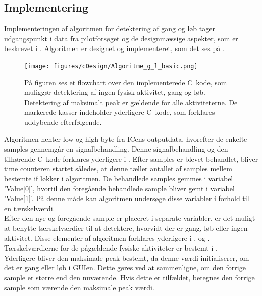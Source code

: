 \subsection{Implementering}
Implementeringen af algoritmen for detektering af gang og løb tager udgangspunkt i data fra pilotforsøget og de designmæssige aspekter, som er beskrevet i . Algoritmen er designet og implementeret, som det ses på .
\begin{figure}[H]
	\centering
	\texttt{[image: figures/cDesign/Algoritme\_g\_l\_basic.png]}
	\caption{På figuren ses et flowchart over den implementerede C~kode, som muliggør detektering af ingen fysisk aktivitet, gang og løb. Detektering af maksimalt peak er gældende for alle aktiviteterne. De markerede kasser indeholder yderligere C~kode, som forklares uddybende efterfølgende.}
	\label{fig:basic_algo_g_l}
\end{figure}\vspace{-0.25cm}
Algoritmen henter low og high byte fra ICens outputdata, hvorefter de enkelte samples gennemgår en signalbehandling. Denne signalbehandling og den tilhørende C~kode forklares yderligere i . Efter samples er blevet behandlet, bliver time counteren startet således, at denne tæller antallet af samples mellem bestemte if løkker i algoritmen. De behandlede samples gemmes i variabel 'Value[0]', hvortil den foregående behandlede sample bliver gemt i variabel 'Value[1]'. På denne måde kan algoritmen undersøge disse variabler i forhold til en tærskelværdi. \\
Efter den nye og foregående sample er placeret i separate variabler, er det muligt at benytte tærskelværdier til at detektere, hvorvidt der er gang, løb eller ingen aktivitet. Disse elementer af algoritmen forklares yderligere i ,  og . Tærskelværdierne for de pågældende fysiske aktiviteter er bestemt i . \\ 
Yderligere bliver den maksimale peak bestemt, da denne værdi initialiserer, om det er gang eller løb i GUIen. Dette gøres ved at sammenligne, om den forrige sample er større end den nuværende. Hvis dette er tilfældet, betegnes den forrige sample som værende den maksimale peak værdi. %


